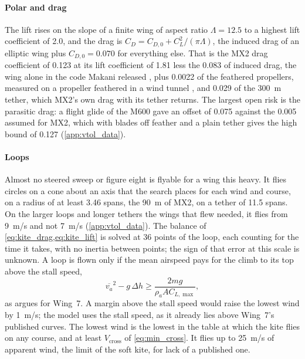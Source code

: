 \paragraph{Polar and drag} The lift rises on the slope of a finite wing of aspect ratio $\Lambda=12.5$ to a highest lift coefficient of 2.0, and the drag is $C_D = C_{D,0} + C_L^2/(\pi\Lambda)$, the induced drag of an elliptic wing plus $C_{D,0}=0.070$ for everything else. That is the MX2 drag coefficient of 0.123 at its lift coefficient of 1.81 \citep{echeverri2020part1} less the 0.083 of induced drag, the wing alone in the code Makani released \citep{makani2020code}, plus 0.0022 of the feathered propellers, measured on a propeller feathered in a wind tunnel \citep{hartman1933}, and 0.029 of the \SI{300}{m} tether, which MX2's own drag with its tether returns. The largest open risk is the parasitic drag: a flight glide of the M600 gave an offset of 0.075 against the 0.005 assumed for MX2, which with blades off feather and a plain tether gives the high bound of 0.127 (\cref{app:vtol_data}).

\paragraph{Loops} Almost no steered sweep or figure eight is flyable for a wing this heavy. It flies circles on a cone about an axis that the search places for each wind and course, on a radius of at least 3.46 spans, the \SI{90}{m} of MX2, on a tether of 11.5 spans. On the larger loops and longer tethers the wings that flew needed, it flies from \SI{9}{m/s} and not \SI{7}{m/s} (\cref{app:vtol_data}). The balance of \cref{eq:kite_drag,eq:kite_lift} is solved at 36 points of the loop, each counting for the time it takes, with no inertia between points; the sign of that error at this scale is unknown. A loop is flown only if the mean airspeed pays for the climb to its top above the stall speed,
\begin{equation}
\overline{v_a}^2 - g\,\Delta h \geq \frac{2mg}{\rho_a A C_{L,\max}},
\label{eq:loop_top}
\end{equation}
as \citet{vanderlind2013} argues for Wing~7. A margin above the stall speed would raise the lowest wind by \SI{1}{m/s}; the model uses the stall speed, as it already lies above Wing~7's published curves. The lowest wind is the lowest in the table at which the kite flies on any course, and at least $V_\mathrm{cross}$ of \cref{eq:min_cross}. It flies up to \SI{25}{m/s} of apparent wind, the limit of the soft kite, for lack of a published one.

